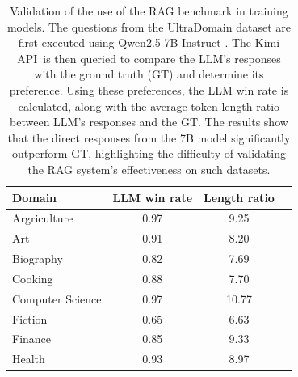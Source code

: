 \documentclass[11pt]{article}
\begin{document}
\begin{table}[t]
\centering
\setlength{\tabcolsep}{1.2pt}
\begin{tabular}{lccc}
\hline
\textbf{Domain} & \textbf{LLM win rate} & \textbf{Length ratio} \\\hline
Argriculture & 0.97 & \phantom{0}9.25 \\
Art & 0.91 & \phantom{0}8.20 \\
Biography & 0.82 & \phantom{0}7.69 \\
Cooking & 0.88 & \phantom{0}7.70 \\
Computer Science & 0.97 & 10.77 \\
Fiction & 0.65 & \phantom{0}6.63 \\
Finance & 0.85 & \phantom{0}9.33 \\
Health & 0.93 & \phantom{0}8.97 \\\hline

\end{tabular}
\caption{
Validation of the use of the RAG benchmark in training models. The questions from the UltraDomain \cite{qian2024memorag} dataset are first executed using Qwen2.5-7B-Instruct \cite{qwen2025qwen25technicalreport}. The Kimi API\protect\footnotemark\ is then queried to compare the LLM's responses with the ground truth (GT) and determine its preference. Using these preferences, the LLM win rate is calculated, along with the average token length ratio between LLM's responses and the GT.
The results show that the direct responses from the 7B model significantly outperform GT, highlighting the difficulty of validating the RAG system's effectiveness on such datasets.}
\label{tab:intro_llm_vs_gt}
\end{table}
\end{document}
